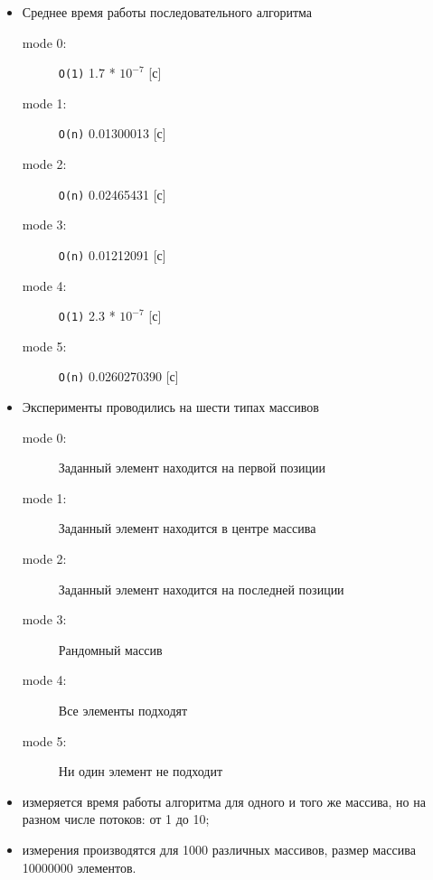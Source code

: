 \begin{itemize}
    \item Среднее время работы последовательного алгоритма

\begin{description}
    \item[mode 0:] \verb|O(1)| 1.7 * $10^{-7}$ [с]
    \item[mode 1:] \verb|O(n)| 0.01300013 [с]
    \item[mode 2:] \verb|O(n)| 0.02465431 [с]
    \item[mode 3:] \verb|O(n)| 0.01212091 [с]
    \item[mode 4:] \verb|O(1)| 2.3 * $10^{-7}$ [с]
    \item[mode 5:] \verb|O(n)| 0.0260270390 [с]
\end{description}
\end{itemize}

\newpage

\raggedbottom {}

\begin{itemize}
    \item Эксперименты проводились на шести типах массивов

\begin{description}
    \item[mode 0:] Заданный элемент находится на первой позиции
    \item[mode 1:] Заданный элемент находится в центре массива
    \item[mode 2:] Заданный элемент находится на последней позиции
    \item[mode 3:] Рандомный массив
    \item[mode 4:] Все элементы подходят
    \item[mode 5:] Ни один элемент не подходит
\end{description}

    \item измеряется время работы алгоритма для одного и того же массива, но на разном числе потоков: от 1 до 10;
    \item измерения производятся для 1\hspace{1mm}000 различных массивов, размер массива 10\hspace{1mm}000\hspace{1mm}000 элементов.
\end{itemize}

